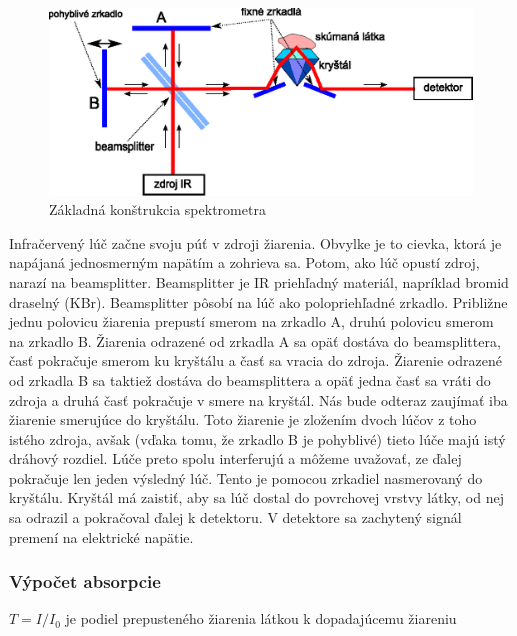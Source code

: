 \begin{figure}[htp]
    \centering
    \includegraphics{obrazky/fyzika/ftir/ftir_schema}
    \caption{Základná konštrukcia spektrometra}\label{fig:ftir_schema}
\end{figure}

Infračervený lúč začne svoju púť v zdroji žiarenia. Obvylke je to 
cievka, ktorá je napájaná jednosmerným napätím a zohrieva sa.
Potom, ako lúč opustí zdroj, narazí na beamsplitter. Beamsplitter
je IR priehľadný materiál, napríklad bromid draselný (KBr). 
Beamsplitter pôsobí
na lúč ako polopriehľadné zrkadlo. Približne jednu polovicu žiarenia
prepustí smerom na zrkadlo A, druhú polovicu smerom na zrkadlo B.
Žiarenia odrazené od zrkadla A sa opäť dostáva do beamsplittera,
časť pokračuje smerom ku kryštálu a časť sa vracia do zdroja.
Žiarenie odrazené od zrkadla B sa taktiež dostáva do beamsplittera a
opäť jedna časť sa vráti do zdroja a druhá časť pokračuje v smere na
kryštál. Nás bude odteraz zaujímať iba žiarenie smerujúce do kryštálu.
Toto žiarenie je zložením dvoch lúčov z toho istého zdroja, avšak
(vďaka tomu, že zrkadlo B je pohyblivé) tieto lúče majú istý
dráhový rozdiel. Lúče preto spolu interferujú a môžeme
uvažovať, ze ďalej pokračuje len jeden výsledný lúč.
Tento je pomocou zrkadiel nasmerovaný do kryštálu. Kryštál má zaistiť,
aby sa lúč dostal do povrchovej vrstvy látky, od nej sa odrazil a
pokračoval ďalej k detektoru. V detektore sa zachytený signál
premení na elektrické napätie.


\subsubsection{Výpočet absorpcie}

\begin{definicia}[Transmitancia]
    $T=I/I_0$ je podiel prepusteného žiarenia látkou k dopadajúcemu
    žiareniu
\end{definicia}

